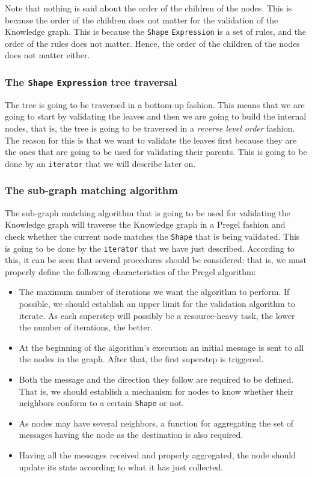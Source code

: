 Note that nothing is said about the order of the children of the nodes. This is because the order of the children does not matter for the validation of the Knowledge graph. This is because the \texttt{Shape} \texttt{Expression} is a set of rules, and the order of the rules does not matter. Hence, the order of the children of the nodes does not matter either.

\subsubsection{The \texttt{Shape} \texttt{Expression} tree traversal}

The tree is going to be traversed in a bottom-up fashion. This means that we are going to start by validating the leaves and then we are going to build the internal nodes, that is, the tree is going to be traversed in a \textit{reverse level order} fashion. The reason for this is that we want to validate the leaves first because they are the ones that are going to be used for validating their parents. This is going to be done by an \texttt{iterator} that we will describe later on.

\subsubsection{The sub-graph matching algorithm}

The sub-graph matching algorithm that is going to be used for validating the Knowledge graph will traverse the Knowledge graph in a Pregel fashion and check whether the current node matches the \texttt{Shape} that is being validated. This is going to be done by the \texttt{iterator} that we have just described. According to this, it can be seen that several procedures should be considered; that is, we must properly define the following characteristics of the Pregel algorithm:

\begin{itemize}
    \itemsep0.5em
    \item The maximum number of iterations we want the algorithm to perform. If possible, we should establish an upper limit for the validation algorithm to iterate. As each superstep will possibly be a resource-heavy task, the lower the number of iterations, the better.
    \item At the beginning of the algorithm's execution an initial message is sent to all the nodes in the graph. After that, the first superstep is triggered.
    \item Both the message and the direction they follow are required to be defined. That is, we should establish a mechanism for nodes to know whether their neighbors conform to a certain \texttt{Shape} or not.
    \item As nodes may have several neighbors, a function for aggregating the set of messages having the node as the destination is also required.
    \item Having all the messages received and properly aggregated, the node should update its state according to what it has just collected.
\end{itemize}

